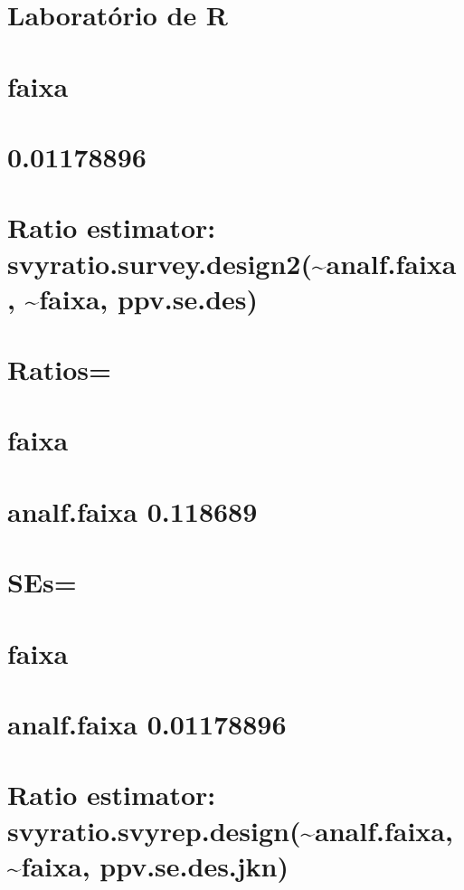 \documentclass[]{book}
\theoremstyle{definition}
\theoremstyle{definition}
\theoremstyle{definition}
\theoremstyle{remark}
\begin{document}
\section{Laboratório de R}\label{laboratorio-de-r}

\section{faixa}\label{faixa}

\section{0.01178896}\label{section-9}

\section{Ratio estimator:
svyratio.survey.design2(\textasciitilde{}analf.faixa,
\textasciitilde{}faixa,
ppv.se.des)}\label{ratio-estimator-svyratio.survey.design2analf.faixa-faixa-ppv.se.des}

\section{Ratios=}\label{ratios-2}

\section{faixa}\label{faixa-1}

\section{analf.faixa 0.118689}\label{analf.faixa-0.118689}

\section{SEs=}\label{ses-2}

\section{faixa}\label{faixa-2}

\section{analf.faixa 0.01178896}\label{analf.faixa-0.01178896}

\section{Ratio estimator:
svyratio.svyrep.design(\textasciitilde{}analf.faixa,
\textasciitilde{}faixa,
ppv.se.des.jkn)}\label{ratio-estimator-svyratio.svyrep.designanalf.faixa-faixa-ppv.se.des.jkn}
\end{document}
